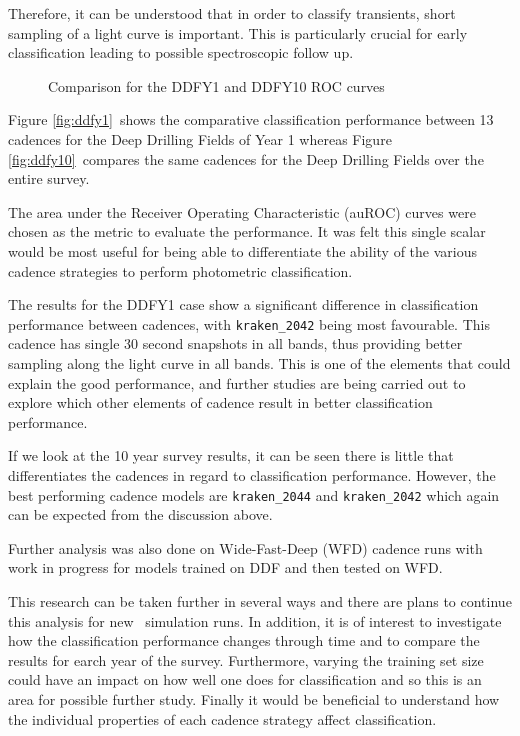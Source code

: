 Therefore, it can be understood that in order to classify transients, short
sampling of a light curve is important. This is particularly crucial for early classification
leading to possible spectroscopic follow up.


\begin{figure}
  \centering
  \caption{Comparison for the DDFY1 and DDFY10 ROC curves}\label{fig:rocs}
\end{figure}

Figure \ref{fig:ddfy1}~shows the comparative classification performance between 13 cadences for the Deep
Drilling Fields of Year 1 whereas Figure \ref{fig:ddfy10}~compares the same
cadences for the Deep Drilling Fields over the entire survey.

The area under the Receiver Operating Characteristic (auROC) curves were chosen as the metric
to evaluate the performance. It was felt this single scalar would be most useful
for being able to differentiate the ability of the various cadence strategies
to perform photometric classification.


The results for the DDFY1 case show a significant difference in classification
performance between cadences, with {\tt kraken\_2042} being most favourable.
This cadence has single 30 second snapshots in all bands, thus providing better
sampling along the light curve in all bands. This is one of the elements that could explain
the good performance, and further studies are being carried out to explore which
other elements of cadence result in better classification performance.

If we look at the 10 year survey results, it can be seen there is
little that differentiates the cadences in regard to classification performance.
However, the best performing cadence models are {\tt kraken\_2044} and
{\tt kraken\_2042} which again can be expected from the discussion above.

Further analysis was also done on Wide-Fast-Deep (WFD) cadence runs with work in
progress for models trained on DDF and then tested on WFD.

This research can be taken further in several ways and there are plans to
continue this analysis for new \opsim~simulation runs.  In addition, it is
of interest to investigate how the classification performance changes through
time and to compare the results for earch year of the survey. Furthermore,
varying the training set size could have an impact on how well one does for
classification and so this is an area for possible further study.
Finally it would be beneficial to understand how the individual properties of each cadence
strategy affect classification.
